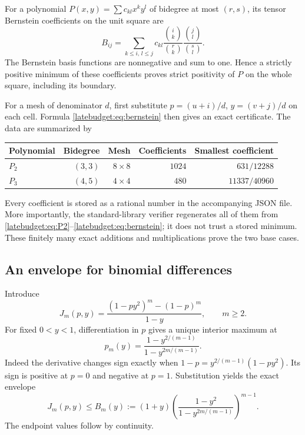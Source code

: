 For a polynomial $P(x,y)=\sum c_{kl}x^ky^l$ of bidegree at most $(r,s)$, its tensor Bernstein coefficients on the unit square are
\begin{equation}\label{latebudget:eq:bernstein}
 B_{ij}=\sum_{k\le i,\,l\le j}c_{kl}
 \frac{\binom ik}{\binom rk}\frac{\binom jl}{\binom sl}.
\end{equation}
The Bernstein basis functions are nonnegative and sum to one. Hence a strictly positive minimum of these coefficients proves strict positivity of $P$ on the whole square, including its boundary.

For a mesh of denominator $d$, first substitute
$p=(u+i)/d$, $y=(v+j)/d$ on each cell. Formula \eqref{latebudget:eq:bernstein} then gives an exact certificate. The data are summarized by
\begin{center}
\begin{tabular}{lrrrr}
\toprule
Polynomial & Bidegree & Mesh & Coefficients & Smallest coefficient\\
\midrule
$P_2$ & $(3,3)$ & $8\times8$ & $1024$ & $631/12288$\\
$P_3$ & $(4,5)$ & $4\times4$ & $480$ & $11337/40960$\\
\bottomrule
\end{tabular}
\end{center}
Every coefficient is stored as a rational number in the accompanying JSON file. More importantly, the standard-library verifier regenerates all of them from \eqref{latebudget:eq:P2}--\eqref{latebudget:eq:bernstein}; it does not trust a stored minimum. These finitely many exact additions and multiplications prove the two base cases.

\subsection{An envelope for binomial differences}
Introduce
\[
 J_m(p,y)=\frac{(1-py^2)^m-(1-p)^m}{1-y},\qquad m\ge2.
\]
For fixed $0<y<1$, differentiation in $p$ gives a unique interior maximum at
\begin{equation}\label{latebudget:eq:pmax}
 p_m(y)=\frac{1-y^{2/(m-1)}}{1-y^{2m/(m-1)}}.
\end{equation}
Indeed the derivative changes sign exactly when
$1-p=y^{2/(m-1)}(1-py^2)$. Its sign is positive at $p=0$ and negative at $p=1$. Substitution yields the exact envelope
\begin{equation}\label{latebudget:eq:envelope}
 J_m(p,y)\le B_m(y):=(1+y)
 \left(\frac{1-y^2}{1-y^{2m/(m-1)}}\right)^{m-1}.
\end{equation}
The endpoint values follow by continuity.

